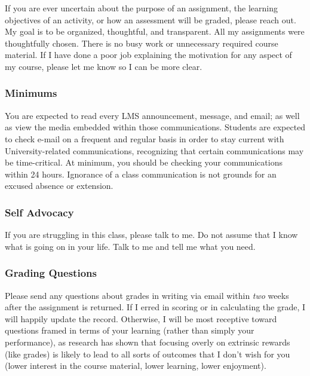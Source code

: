 \documentclass[11pt,]{article}
\begin{document}
If you are ever uncertain about the purpose of an assignment, the
learning objectives of an activity, or how an assessment will be graded,
please reach out. My goal is to be organized, thoughtful, and
transparent. All my assignments were thoughtfully chosen. There is no
busy work or unnecessary required course material. If I have done a poor
job explaining the motivation for any aspect of my course, please let me
know so I can be more clear.

\hypertarget{minimums}{%
\subsubsection{Minimums}\label{minimums}}

You are expected to read every LMS announcement, message, and email; as
well as view the media embedded within those communications. Students
are expected to check e-mail on a frequent and regular basis in order to
stay current with University-related communications, recognizing that
certain communications may be time-critical. At minimum, you should be
checking your communications within 24 hours. Ignorance of a class
communication is not grounds for an excused absence or extension.

\hypertarget{self-advocacy}{%
\subsubsection{Self Advocacy}\label{self-advocacy}}

If you are struggling in this class, please talk to me. Do not assume
that I know what is going on in your life. Talk to me and tell me what
you need.

\hypertarget{grading-questions}{%
\subsubsection{Grading Questions}\label{grading-questions}}

Please send any questions about grades in writing via email within
\emph{two} weeks after the assignment is returned. If I erred in scoring
or in calculating the grade, I will happily update the record.
Otherwise, I will be most receptive toward questions framed in terms of
your learning (rather than simply your performance), as research has
shown that focusing overly on extrinsic rewards (like grades) is likely
to lead to all sorts of outcomes that I don't wish for you (lower
interest in the course material, lower learning, lower enjoyment).
\end{document}
